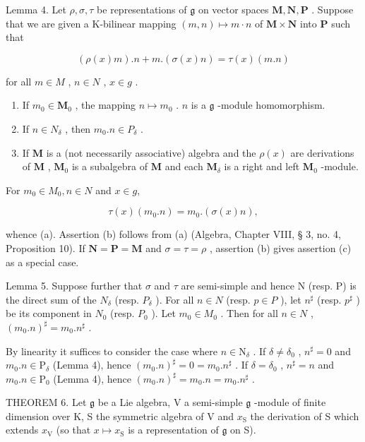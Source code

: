 Lemma 4. Let \(\rho, \sigma, \tau\) be representations of \(\mathfrak{g}\) on vector spaces \(\mathbf{M}, \mathbf{N}, \mathbf{P}\) . Suppose that we are given a K-bilinear mapping \((m, n) \mapsto m \cdot n\) of \(\mathbf{M} \times \mathbf{N}\) into \(\mathbf{P}\) such that

\[
(\rho (x) m). n + m. (\sigma (x) n) = \tau (x) (m. n)
\]

for all \(m \in M\) , \(n \in N\) , \(x \in g\) .

\begin{enumerate}
\def\labelenumi{(\alph{enumi})}
\item
  If \(m_0 \in \mathbf{M}_0\) , the mapping \(n \mapsto m_0\) . \(n\) is a \(\mathfrak{g}\) -module homomorphism.
\item
  If \(n \in N_{\delta}\) , then \(m_{0}.n \in P_{\delta}\) .
\item
  If \(\mathbf{M}\) is a (not necessarily associative) algebra and the \(\rho(x)\) are derivations of \(\mathbf{M}\) , \(\mathbf{M}_0\) is a subalgebra of \(\mathbf{M}\) and each \(\mathbf{M}_{\delta}\) is a right and left \(\mathbf{M}_0\) -module.
\end{enumerate}

For \(m_{0} \in M_{0}, n \in N\) and \(x \in g,\)

\[
\tau (x) \left(m _ {0}. n\right) = m _ {0}. (\sigma (x) n),
\]

whence (a). Assertion (b) follows from (a) (Algebra, Chapter VIII, § 3, no. 4, Proposition 10). If \(\mathbf{N} = \mathbf{P} = \mathbf{M}\) and \(\sigma = \tau = \rho\) , assertion (b) gives assertion (c) as a special case.

Lemma 5. Suppose further that \(\sigma\) and \(\tau\) are semi-simple and hence N (resp. P) is the direct sum of the \(N_{\delta}\) (resp. \(P_{\delta}\) ). For all \(n \in N\) (resp. \(p \in P\) ), let \(n^{\sharp}\) (resp. \(p^{\sharp}\) ) be its component in \(N_0\) (resp. \(P_0\) ). Let \(m_0 \in M_0\) . Then for all \(n \in N\) , \((m_0.n)^{\sharp} = m_0.n^{\sharp}\) .

By linearity it suffices to consider the case where \(n \in \mathrm{N}_{\delta}\) . If \(\delta \neq \delta_0\) , \(n^{\sharp} = 0\) and \(m_0.n \in \mathrm{P}_{\delta}\) (Lemma 4), hence \((m_0.n)^{\sharp} = 0 = m_0.n^{\sharp}\) . If \(\delta = \delta_0\) , \(n^{\sharp} = n\) and \(m_0.n \in \mathrm{P}_0\) (Lemma 4), hence \((m_0.n)^{\sharp} = m_0.n = m_0.n^{\sharp}\) .

THEOREM 6. Let \(\mathfrak{g}\) be a Lie algebra, V a semi-simple \(\mathfrak{g}\) -module of finite dimension over K, S the symmetric algebra of V and \(x_{\mathrm{S}}\) the derivation of S which extends \(x_{\mathrm{V}}\) (so that \(x \mapsto x_{\mathrm{S}}\) is a representation of \(\mathfrak{g}\) on S).

